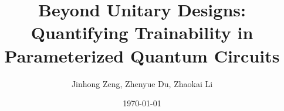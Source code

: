\documentclass[%
 reprint,
 superscriptaddress,
 amsmath,amssymb,
 aps, prl, twocolumn, showpacs,
]{revtex4-2}
\begin{document}

\title{Beyond Unitary Designs: Quantifying Trainability in Parameterized Quantum Circuits}

\author{Jinhong Zeng, Zhenyue Du, Zhaokai Li}




\date{\today}%
\end{document}
